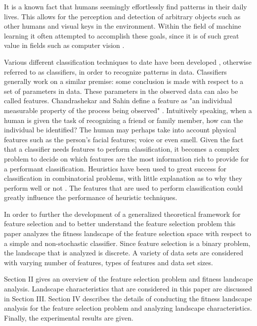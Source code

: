 \documentclass[journal,comsoc]{IEEEtran}
\begin{document}
It is a known fact that humans seemingly effortlessly find patterns in their daily lives. This allows for the perception and detection of arbitrary objects such as other humans and visual keys in the environment. Within the field of machine learning it often attempted to accomplish these goals, since it is of such great value in fields such as computer vision \cite{wernick2010machine}.

Various different classification techniques to date have been developed \cite{nguyen2008survey}, otherwise referred to as classifiers, in order to recognize patterns in data. Classifiers generally work on a similar premise: some conclusion is made with respect to a set of parameters in data. These parameters in the observed data can also be called features. Chandrashekar and Sahin define a feature as "an individual measurable property of the process being observed" \cite{chandrashekar2014survey}. Intuitively speaking, when a human is given the task of recognizing a friend or family member, how can the individual be identified? The human may perhaps take into account physical features such as the person's facial features; voice or even smell. Given the fact that a classifier needs features to perform classification, it becomes a complex problem to decide on which features are the most information rich to provide for a performant classification. Heuristics have been used to great success for classification in combinatorial problems, with little explanation as to why they perform well or not \cite{belaidouni1999landscapes}. The features that are used to perform classification could greatly influence the performance of heuristic techniques.

In order to further the development of a generalized theoretical framework for feature selection and to better understand the feature selection problem this paper analyzes the fitness landscape of the feature selection space with respect to a simple and non-stochastic classifier. Since feature selection is a binary problem, the landscape that is analyzed is discrete. A variety of data sets are considered with varying number of features, types of features and data set sizes.

Section II gives an overview of the feature selection problem and fitness landscape analysis. Landscape characteristics that are considered in this paper are discussed in Section III. Section IV describes the details of conducting the fitness landscape analysis for the feature selection problem and analyzing landscape characteristics. Finally, the experimental results are given.
\end{document}
